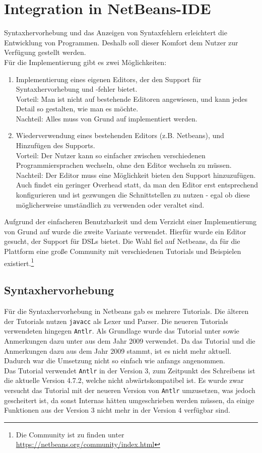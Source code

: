 
\chapter{Integration in NetBeans-IDE}

Syntaxhervorhebung und das Anzeigen von Syntaxfehlern erleichtert die Entwicklung von Programmen.
Deshalb soll dieser Komfort dem Nutzer zur Verfügung gestellt werden.\\
Für die Implementierung gibt es zwei Möglichkeiten:
\begin{enumerate}
\item Implementierung eines eigenen Editors, der den Support für Syntaxhervorhebung und -fehler bietet.\\
Vorteil: Man ist nicht auf bestehende Editoren angewiesen, und kann jedes Detail so gestalten, wie man es möchte.\\
Nachteil: Alles muss von Grund auf implementiert werden.
\item Wiederverwendung eines bestehenden Editors (z.B. Netbeans), und Hinzufügen des Supports.\\
Vorteil: Der Nutzer kann so einfacher zwischen verschiedenen Programmiersprachen wechseln, ohne den Editor wechseln zu müssen.\\
Nachteil: Der Editor muss eine Möglichkeit bieten den Support hinzuzufügen.
Auch findet ein geringer Overhead statt, da man den Editor erst entsprechend konfigurieren und ist gezwungen die Schnittstellen zu nutzen - egal ob diese möglicherweise umständlich zu verwenden oder veraltet sind.
\end{enumerate}
Aufgrund der einfacheren Benutzbarkeit und dem Verzicht einer Implementierung von Grund auf wurde die zweite Variante verwendet.
Hierfür wurde ein Editor gesucht, der Support für \acp{DSL} bietet.
Die Wahl fiel auf Netbeans, da für die Plattform eine große Community mit verschiedenen Tutorials und Beispielen existiert.\footnote{Die Community ist zu finden unter \url{https://netbeans.org/community/index.html}}

\section{Syntaxhervorhebung}
Für die Syntaxhervorhebung in Netbeans gab es mehrere Tutorials.
Die älteren der Tutorials nutzen \texttt{javacc} als Lexer und Parser.
Die neueren Tutorials verwendeten hingegen \texttt{Antlr}.
Als Grundlage wurde das Tutorial unter \cite{netbeansSyntax} sowie Anmerkungen dazu unter \cite{netbeansSyntaxNotes} aus dem Jahr 2009 verwendet.
Da das Tutorial und die Anmerkungen dazu aus dem Jahr 2009 stammt, ist es nicht mehr aktuell.
Dadurch war die Umsetzung nicht so einfach wie anfangs angenommen.\\
Das Tutorial verwendet \texttt{Antlr} in der Version 3, zum Zeitpunkt des Schreibens ist die aktuelle Version 4.7.2, welche nicht abwärtskompatibel ist.
Es wurde zwar versucht das Tutorial mit der neueren Version von \texttt{Antlr} umzusetzen, was jedoch gescheitert ist, da sonst Internas hätten umgeschrieben werden müssen, da einige Funktionen aus der Version 3 nicht mehr in der Version 4 verfügbar sind.\\

